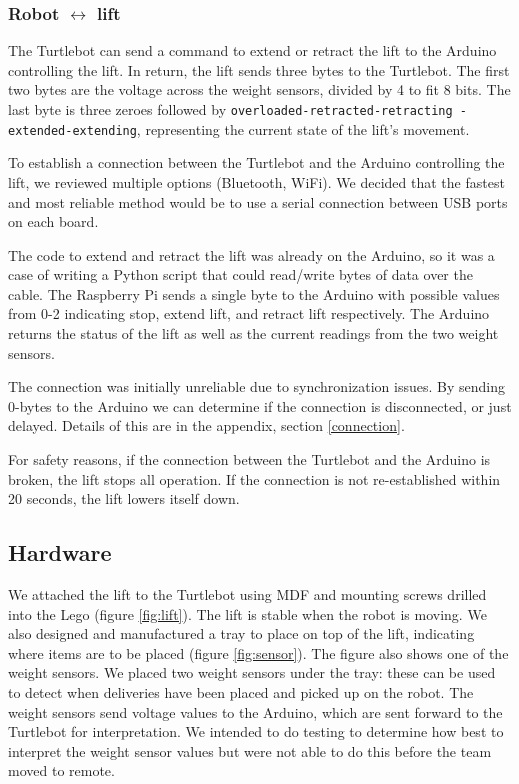 \documentclass{article}
\begin{document}
\subsubsection{Robot $\leftrightarrow$ lift}
The Turtlebot can send a command to extend or retract the lift to the Arduino controlling the lift. In return, the lift sends three bytes to the Turtlebot. The first two bytes are the voltage across the weight sensors, divided by 4 to fit 8 bits. The last byte is three zeroes followed by {\tt overloaded-retracted-retracting}\ {\tt -extended-extending}, representing the current state of the lift's movement.

To establish a connection between the Turtlebot and the Arduino controlling the lift, we reviewed multiple options (Bluetooth, WiFi). We decided that the fastest and most reliable method would be to use a serial connection between USB ports on each board.

The code to extend and retract the lift was already on the Arduino, so it was a case of writing a Python script that could read/write bytes of data over the cable. The Raspberry Pi sends a single byte to the Arduino with possible values from 0-2 indicating stop, extend lift, and retract lift respectively. The Arduino returns the status of the lift as well as the current readings from the two weight sensors.

The connection was initially unreliable due to synchronization issues. By sending 0-bytes to the Arduino we can determine if the connection is disconnected, or just delayed. Details of this are in the appendix, section \ref{connection}.

For safety reasons, if the connection between the Turtlebot and the Arduino is broken, the lift stops all operation. If the connection is not re-established within 20 seconds, the lift lowers itself down.  

\subsection{Hardware}
We attached the lift to the Turtlebot using MDF and mounting screws drilled into the Lego (figure \ref{fig:lift}). The lift is stable when the robot is moving. We also designed and manufactured a tray to place on top of the lift, indicating where items are to be placed (figure \ref{fig:sensor}). The figure also shows one of the weight sensors. We placed two weight sensors under the tray: these can be used to detect when deliveries have been placed and picked up on the robot. The weight sensors send voltage values to the Arduino, which are sent forward to the Turtlebot for interpretation. We intended to do testing to determine how best to interpret the weight sensor values but were not able to do this before the team moved to remote. 
\end{document}
